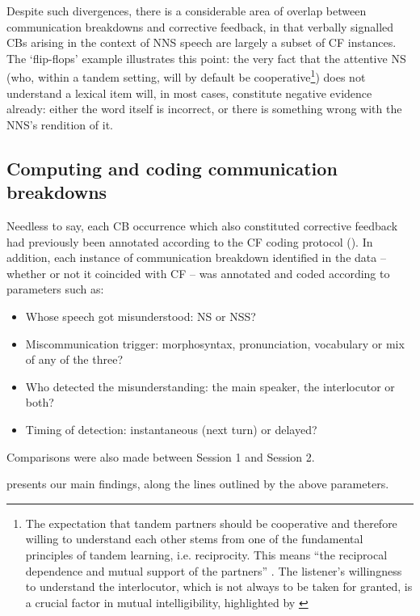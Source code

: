 \documentclass[output=paper,colorlinks,citecolor=brown,modfonts,nonflat]{../langscibook}
\begin{document}
Despite such divergences, there is a considerable area of overlap between communication breakdowns and corrective feedback, in that verbally signalled CBs arising in the context of NNS speech are largely a subset of CF instances. The ‘flip-flops’ example  illustrates this point: the very fact that the attentive NS (who, within a tandem setting, will by default be cooperative\footnote{{The expectation that tandem partners should be cooperative and therefore willing to understand each other stems from one of the fundamental principles of tandem learning, i.e. reciprocity. This means “the reciprocal dependence and mutual support of the partners” \citep[11]{Brammerts1996}. The listener’s willingness to understand the interlocutor, which is not always to be taken for granted, is a crucial factor in mutual intelligibility, highlighted by \citet[4]{ChambersTrudgill1998}}}) does not understand a lexical item will, in most cases, constitute negative evidence already: either the word itself is incorrect, or there is something wrong with the NNS’s rendition of it.

\subsection{Computing and coding communication breakdowns}\label{sec:scheuer:5.2}

Needless to say, each CB occurrence which also constituted corrective feedback had previously been annotated according to the CF coding protocol (). In addition, each instance of communication breakdown identified in the data – whether or not it coincided with CF – was annotated and coded according to parameters such as:

\begin{itemize}
\item Whose speech got misunderstood: NS or NSS?
\item Miscommunication trigger: morphosyntax, pronunciation, vocabulary or mix of any of the three?
\item Who detected the misunderstanding: the main speaker, the interlocutor or both?
\item Timing of detection: instantaneous (next turn) or delayed?
\end{itemize}

Comparisons were also made between Session 1 and Session 2.

   presents our main findings, along the lines outlined by the above parameters.
\end{document}
